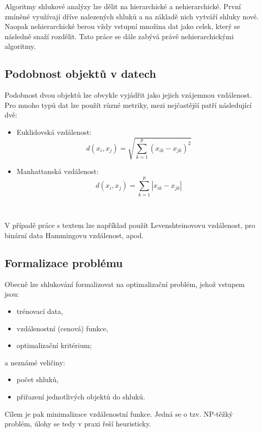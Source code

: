 \documentclass[pdftex,a4paper]{article}
\begin{document}
Algoritmy shlukové analýzy lze dělit na hierarchické a nehierarchické. První zmíněné využívají dříve nalezených shluků a na základě nich vytváří shluky nové. Naopak nehierarchické berou vždy vstupní množina dat jako celek, který se následně snaží rozdělit. Tato práce se dále zabývá právě nehierarchickými algoritmy.



\subsection{Podobnost objektů v datech}

Podobnost dvou objektů lze obvykle vyjádřit jako jejich vzájemnou vzdálenost. Pro mnoho typů dat lze použít různé metriky, mezi nejčastější patří následující dvě:

\begin{itemize}
	\item Euklidovská vzdálenost: \[d(x_i,x_j) = \sqrt{\sum_{k=1}^p (x_{ik}-x_{jk})^2}\]
	\item Manhattanská vzdálenost: \[d(x_i,x_j) = \sum_{k=1}^p \left| x_{ik}-x_{jk} \right|\]
\end{itemize}~

V případě práce s textem lze například použít Levenshteinovovu vzdálenost, pro binární data Hammingovu vzdálenost, apod.



\subsection{Formalizace problému}

Obecně lze shlukování formalizovat na optimalizační problém, jehož vstupem jsou:
\begin{itemize}
	\item trénovací data,
	\item vzdálenostní (cenová) funkce,
	\item optimalizační kritérium;
\end{itemize}
a neznámé veličiny:
\begin{itemize}
	\item počet shluků,
	\item přiřazení jednotlivých objektů do shluků.
\end{itemize}

Cílem je pak minimalizace vzdálenostní funkce. Jedná se o tzv. NP-těžký problém, úlohy se tedy v praxi řeší heuristicky.
\end{document}
